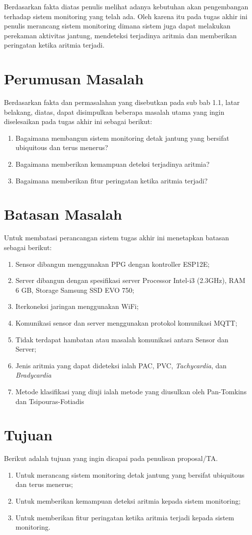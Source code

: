 Berdasarkan fakta diatas penulis melihat adanya kebutuhan akan pengembangan terhadap sistem monitoring yang telah ada. Oleh karena itu pada tugas akhir ini penulis merancang sistem monitoring dimana sistem juga dapat melakukan perekaman aktivitas jantung, mendeteksi terjadinya aritmia dan memberikan peringatan ketika aritmia terjadi.

\section{Perumusan Masalah}
Berdasarkan fakta dan permasalahan yang disebutkan pada sub bab 1.1, latar belakang, diatas, dapat disimpulkan beberapa masalah utama yang ingin diselesaikan pada tugas akhir ini sebagai berikut:
\begin{enumerate}
	\item Bagaimana membangun sistem monitoring detak jantung yang bersifat ubiquitous dan terus menerus?
	\item Bagaimana memberikan kemampuan deteksi terjadinya aritmia?
	\item Bagaimana memberikan fitur peringatan ketika aritmia terjadi?
\end{enumerate}
\section{Batasan Masalah}
Untuk membatasi perancangan sistem tugas akhir ini menetapkan batasan sebagai berikut:
\begin{enumerate}
	\item Sensor dibangun menggunakan PPG dengan kontroller ESP12E;
    \item Server dibangun dengan spesifikasi server Processor Intel-i3 (2.3GHz), RAM 6 GB, Storage Samsung SSD EVO 750;
    \item Iterkoneksi jaringan menggunakan WiFi;
    \item Komunikasi sensor dan server menggunakan protokol
     komunikasi MQTT;
    \item Tidak terdapat hambatan atau masalah komunikasi antara Sensor dan Server;
    \item Jenis aritmia yang dapat dideteksi ialah PAC, PVC, \textit{Tachycardia}, dan \textit{Bradycardia}
    \item Metode klasifikasi yang diuji ialah metode yang diusulkan oleh Pan-Tomkins dan Tsipouras-Fotiadis
\end{enumerate}
\section{Tujuan}
Berikut adalah tujuan yang ingin dicapai pada penulisan proposal/TA.
\begin{enumerate}
    \item Untuk merancang sistem monitoring detak jantung yang bersifat ubiquitous dan terus menerus;
    \item Untuk memberikan kemampuan deteksi aritmia kepada sistem monitoring;
    \item Untuk memberikan fitur peringatan ketika aritmia terjadi kepada sistem monitoring.
\end{enumerate}
